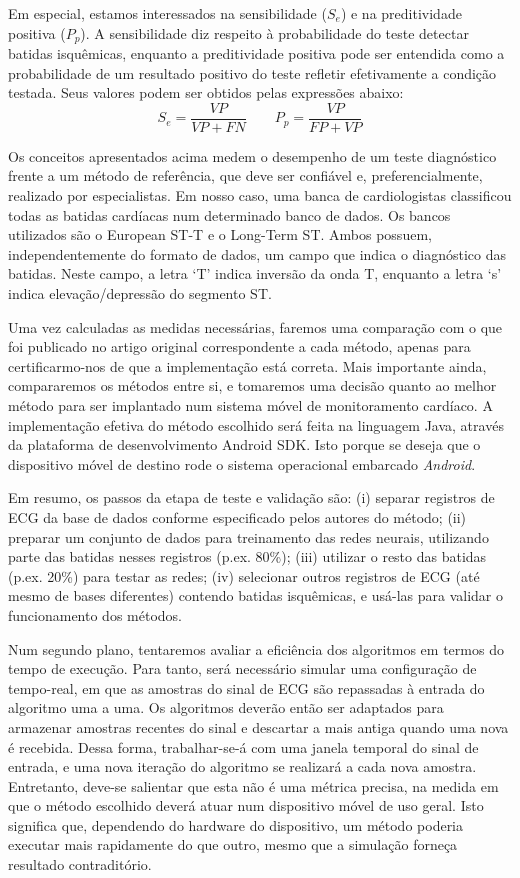 Em especial, estamos interessados na sensibilidade ($S_e$) e na preditividade positiva ($P_p$). A sensibilidade diz respeito à probabilidade do teste detectar batidas isquêmicas, enquanto a preditividade positiva pode ser entendida como a probabilidade de um resultado positivo do teste refletir efetivamente a condição testada. Seus valores podem ser obtidos pelas expressões abaixo:
\begin{equation} \label{equ:metrics}
    S_e = \frac{VP}{VP+FN}
    \quad\quad
    P_p = \frac{VP}{FP+VP}
\end{equation}

Os conceitos apresentados acima medem o desempenho de um teste diagnóstico frente a um método de referência, que deve ser confiável e, preferencialmente, realizado por especialistas. Em nosso caso, uma banca de cardiologistas classificou todas as batidas cardíacas num determinado banco de dados. Os bancos utilizados são o European ST-T e o Long-Term ST. Ambos possuem, independentemente do formato de dados, um campo que indica o diagnóstico das batidas. Neste campo, a letra `T' indica inversão da onda T, enquanto a letra `s' indica elevação/depressão do segmento ST.

Uma vez calculadas as medidas necessárias, faremos uma comparação com o que foi publicado no artigo original correspondente a cada método, apenas para certificarmo-nos de que a implementação está correta. Mais importante ainda, compararemos os métodos entre si, e tomaremos uma decisão quanto ao melhor método para ser implantado num sistema móvel de monitoramento cardíaco. A implementação efetiva do método escolhido será feita na linguagem Java, através da plataforma de desenvolvimento Android SDK. Isto porque se deseja que o dispositivo móvel de destino rode o sistema operacional embarcado \emph{Android}.

Em resumo, os passos da etapa de teste e validação são: (i) separar registros de ECG da base de dados conforme especificado pelos autores do método; (ii) preparar um conjunto de dados para treinamento das redes neurais, utilizando parte das batidas nesses registros (p.ex. 80\%); (iii) utilizar o resto das batidas (p.ex. 20\%) para testar as redes; (iv) selecionar outros registros de ECG (até mesmo de bases diferentes) contendo batidas isquêmicas, e usá-las para validar o funcionamento dos métodos.

Num segundo plano, tentaremos avaliar a eficiência dos algoritmos em termos do tempo de execução. Para tanto, será necessário simular uma configuração de tempo-real, em que as amostras do sinal de ECG são repassadas à entrada do algoritmo uma a uma. Os algoritmos deverão então ser adaptados para armazenar amostras recentes do sinal e descartar a mais antiga quando uma nova é recebida. Dessa forma, trabalhar-se-á com uma janela temporal do sinal de entrada, e uma nova iteração do algoritmo se realizará a cada nova amostra. Entretanto, deve-se salientar que esta não é uma métrica precisa, na medida em que o método escolhido deverá atuar num dispositivo móvel de uso geral. Isto significa que, dependendo  do hardware do dispositivo, um método poderia executar mais rapidamente do que outro, mesmo que a simulação forneça resultado contraditório.

